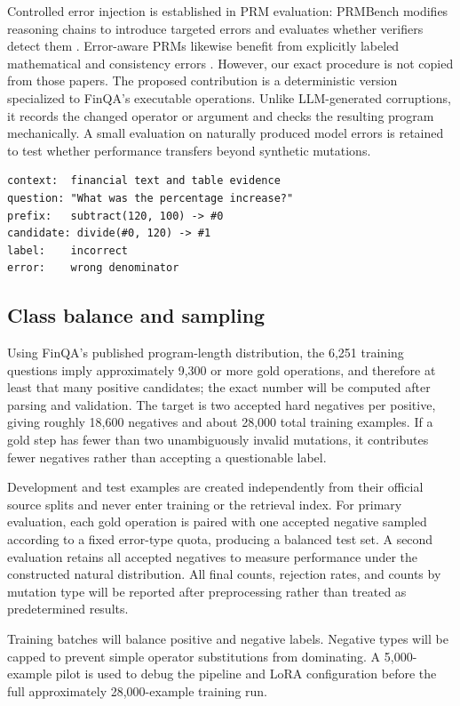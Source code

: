 \documentclass[10pt,twocolumn]{article}
\begin{document}
Controlled error injection is established in PRM evaluation: PRMBench modifies reasoning chains to introduce targeted errors and evaluates whether verifiers detect them \citep{prmbench2025}. Error-aware PRMs likewise benefit from explicitly labeled mathematical and consistency errors \citep{pathfinder2025}. However, our exact procedure is not copied from those papers. The proposed contribution is a deterministic version specialized to FinQA's executable operations. Unlike LLM-generated corruptions, it records the changed operator or argument and checks the resulting program mechanically. A small evaluation on naturally produced model errors is retained to test whether performance transfers beyond synthetic mutations.

\begin{lstlisting}[style=compact,caption={Conceptual construction of a next-step example.},label={lst:example}]
context:  financial text and table evidence
question: "What was the percentage increase?"
prefix:   subtract(120, 100) -> #0
candidate: divide(#0, 120) -> #1
label:    incorrect
error:    wrong denominator
\end{lstlisting}

\subsection{Class balance and sampling}
Using FinQA's published program-length distribution, the 6,251 training questions imply approximately 9,300 or more gold operations, and therefore at least that many positive candidates; the exact number will be computed after parsing and validation. The target is two accepted hard negatives per positive, giving roughly 18,600 negatives and about 28,000 total training examples. If a gold step has fewer than two unambiguously invalid mutations, it contributes fewer negatives rather than accepting a questionable label.

Development and test examples are created independently from their official source splits and never enter training or the retrieval index. For primary evaluation, each gold operation is paired with one accepted negative sampled according to a fixed error-type quota, producing a balanced test set. A second evaluation retains all accepted negatives to measure performance under the constructed natural distribution. All final counts, rejection rates, and counts by mutation type will be reported after preprocessing rather than treated as predetermined results.

Training batches will balance positive and negative labels. Negative types will be capped to prevent simple operator substitutions from dominating. A 5,000-example pilot is used to debug the pipeline and LoRA configuration before the full approximately 28,000-example training run.
\end{document}
